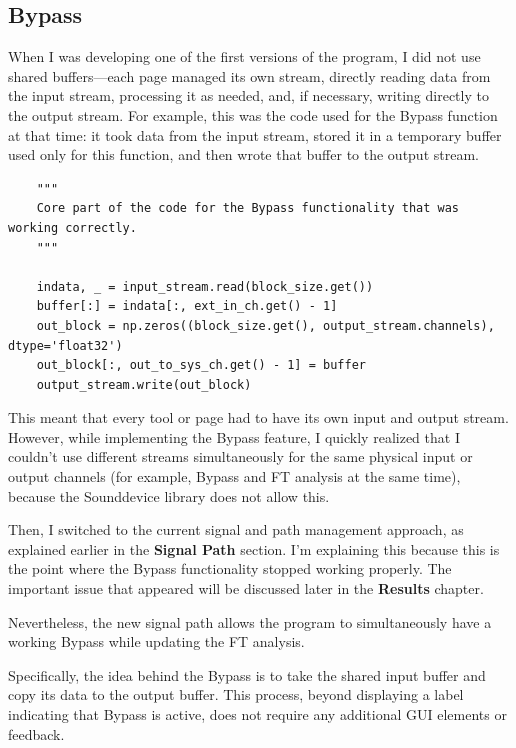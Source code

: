 \subsection{Bypass}

When I was developing one of the first versions of the program, I did not use shared buffers—each page managed its own stream, directly reading data from the input stream, processing it as needed, and, if necessary, writing directly to the output stream. For example, this was the code used for the Bypass function at that time: it took data from the input stream, stored it in a temporary buffer used only for this function, and then wrote that buffer to the output stream.

\begin{verbatim}
	"""
	Core part of the code for the Bypass functionality that was working correctly.
	"""
	
	indata, _ = input_stream.read(block_size.get())
	buffer[:] = indata[:, ext_in_ch.get() - 1]
	out_block = np.zeros((block_size.get(), output_stream.channels), dtype='float32')
	out_block[:, out_to_sys_ch.get() - 1] = buffer
	output_stream.write(out_block)
\end{verbatim}

This meant that every tool or page had to have its own input and output stream. However, while implementing the Bypass feature, I quickly realized that I couldn't use different streams simultaneously for the same physical input or output channels (for example, Bypass and FT analysis at the same time), because the Sounddevice library does not allow this.

Then, I switched to the current signal and path management approach, as explained earlier in the \textbf{Signal Path} section. I'm explaining this because this is the point where the Bypass functionality stopped working properly. The important issue that appeared will be discussed later in the \textbf{Results} chapter.

Nevertheless, the new signal path allows the program to simultaneously have a working Bypass while updating the FT analysis.

Specifically, the idea behind the Bypass is to take the shared input buffer and copy its data to the output buffer. This process, beyond displaying a label indicating that Bypass is active, does not require any additional GUI elements or feedback.

